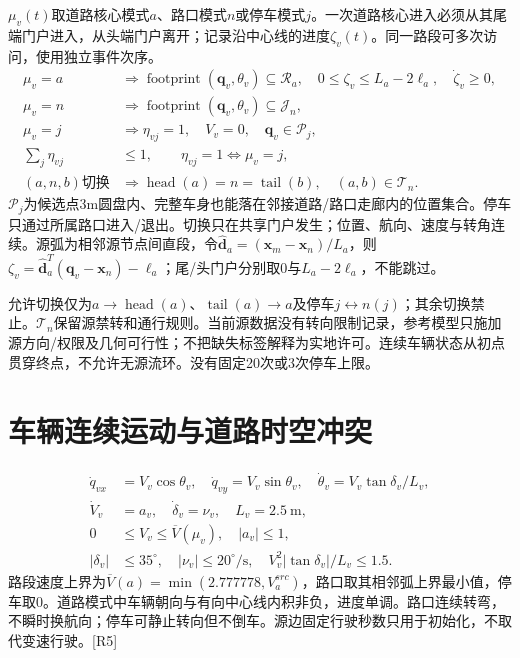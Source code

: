 \noindent $\mu_v(t)$取道路核心模式$a$、路口模式$n$或停车模式$j$。一次道路核心进入必须从其尾端门户进入，从头端门户离开；记录沿中心线的进度$\zeta_v(t)$。同一路段可多次访问，使用独立事件次序。
\begin{align}
 \mu_v=a&\Rightarrow \operatorname{footprint}(\mathbf q_v,\theta_v)\subseteq\mathcal R_a,\quad
 0\le\zeta_v\le L_a-2\ell_a,\quad\dot\zeta_v\ge0,\\
 \mu_v=n&\Rightarrow\operatorname{footprint}(\mathbf q_v,\theta_v)\subseteq\mathcal J_n,\\
 \mu_v=j&\Rightarrow\eta_{vj}=1,\quad V_v=0,\quad
 \mathbf q_v\in\mathcal P_j,\label{eng:eq:roadfull}\\
 \sum_j\eta_{vj}&\le1,\qquad
 \eta_{vj}=1\Leftrightarrow\mu_v=j,\\
 (a,n,b)\text{切换}&\Rightarrow\operatorname{head}(a)=n=\operatorname{tail}(b),\quad
 (a,b)\in\mathcal T_n.\label{eng:eq:roadtransition}
\end{align}
\noindent $\mathcal P_j$为候选点3m圆盘内、完整车身也能落在邻接道路/路口走廊内的位置集合。停车只通过所属路口进入/退出。切换只在共享门户发生；位置、航向、速度与转角连续。源弧为相邻源节点间直段，令$\widehat{\mathbf d}_a=(\mathbf x_m-\mathbf x_n)/L_a$，则$\zeta_v=\widehat{\mathbf d}_a^T(\mathbf q_v-\mathbf x_n)-\ell_a$；尾/头门户分别取0与$L_a-2\ell_a$，不能跳过。

\noindent 允许切换仅为$a\to\operatorname{head}(a)$、$\operatorname{tail}(a)\to a$及停车$j\leftrightarrow n(j)$；其余切换禁止。$\mathcal T_n$保留源禁转和通行规则。当前源数据没有转向限制记录，参考模型只施加源方向/权限及几何可行性；不把缺失标签解释为实地许可。连续车辆状态从初点贯穿终点，不允许无源流环。没有固定20次或3次停车上限。
\clearpage

\section{车辆连续运动与道路时空冲突}
\begin{align}
 \dot q_{vx}&=V_v\cos\theta_v,\quad \dot q_{vy}=V_v\sin\theta_v,\quad
 \dot\theta_v=V_v\tan\delta_v/L_v,\\
 \dot V_v&=a_v,\quad\dot\delta_v=\nu_v,\quad L_v=2.5\ \mathrm m,\\
 0&\le V_v\le\overline V(\mu_v),\quad |a_v|\le1,\\
 |\delta_v|&\le35^\circ,\quad|\nu_v|\le20^\circ/\mathrm s,\quad
 V_v^2|\tan\delta_v|/L_v\le1.5.
 \label{eng:eq:ugv}
\end{align}
\noindent 路段速度上界为$\overline V(a)=\min(2.777778,V_a^{src})$，路口取其相邻弧上界最小值，停车取0。道路模式中车辆朝向与有向中心线内积非负，进度单调。路口连续转弯，不瞬时换航向；停车可静止转向但不倒车。源边固定行驶秒数只用于初始化，不取代变速行驶。[R5]

